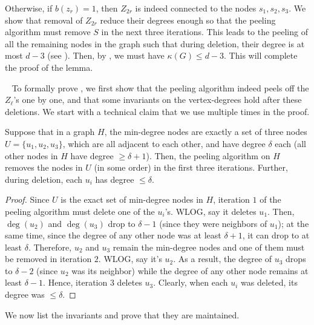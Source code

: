 \documentclass[11pt,letterpaper]{article}
\renewcommand{\geq}{\geqslant}
\renewcommand{\leq}{\leqslant}
\theoremstyle{definition}
\newcommand{\mypar}[1]{\smallskip\noindent{\sffamily\bfseries #1.}~}
\begin{document}
Otherwise, if $b(z_r)=1$, then $Z_{2r}$ is indeed connected to the nodes $s_1,s_2,s_3$. We show that removal of $Z_{2r}$ reduce their degrees enough so that the peeling algorithm must remove $S$ in the next three iterations. This leads to the peeling of all the remaining nodes in the graph such that during deletion, their degree is at most $d-3$ (see ). Then, by , we must have $\kappa(G)\leq d-3$. This will complete the proof of the lemma. 

\mypar{Proof details} To formally prove , we first show that the peeling algorithm indeed peels off the $Z_\ell$'s one by one, and that some invariants on the vertex-degrees hold after these deletions. We start with a technical claim that we use multiple times in the proof. 

\begin{claim}\label{clm:zl-del}
Suppose that in a graph $H$, the min-degree nodes are exactly a set of three nodes $U=\{u_1,u_2,u_3\}$, which are all adjacent to each other, and have degree $\delta$ each (all other nodes in $H$ have degree $\geq \delta+1$). Then, the peeling algorithm on $H$ removes the nodes in $U$ (in some order) in the first three iterations. Further, during deletion, each $u_i$ has degree $\leq \delta$. 
\end{claim}

\begin{proof}
Since $U$ is the exact set of min-degree nodes in $H$, iteration $1$ of the peeling algorithm must delete one of the $u_i$'s. WLOG, say it deletes $u_1$. Then, $\deg(u_2)$ and $\deg(u_3)$ drop to $\delta-1$ (since they were neighbors of $u_1$); at the same time, since the degree of any other node was at least $\delta+1$, it can drop to at least $\delta$. Therefore, $u_2$ and $u_3$ remain the min-degree nodes and one of them must be removed in iteration $2$. WLOG, say it's $u_2$. As a result, the degree of $u_3$ drops to $\delta-2$ (since $u_2$ was its neighbor) while the degree of any other node remains at least $\delta-1$. Hence, iteration $3$ deletes $u_3$. Clearly, when each $u_i$ was deleted, its degree was $\leq \delta$.
\end{proof}

We now list the invariants and prove that they are maintained.
\end{document}
